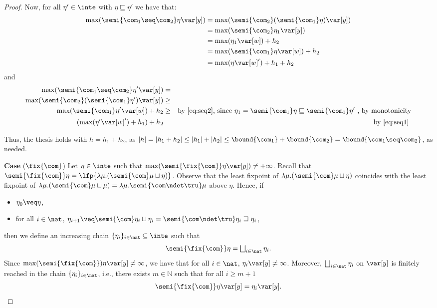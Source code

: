 \begin{proof}
  Now, for all \(\eta' \in \inte\) with \(\eta \sqsubseteq \eta'\) we have that:
  \begin{align*}
    \max(\semi{\com_1 \seq \com_2}\eta \var[y])
    &= \max(\semi{\com_2}(\semi{\com_1}\eta) \var[y])\\
    & = \max(\semi{\com_2}\eta_1 \var[y])\\
    & = \max(\eta_1 \var[w]) + h_2\\
    & = \max(\semi{\com_1}\eta \var[w]) + h_2\\
    & = \max(\eta \var[w]')+h_1 + h_2
  \end{align*}
  and
  \begin{align*}
    \max(\semi{\com_1 \seq \com_2}\eta' \var[y]) & = & \\ 
    \max(\semi{\com_2}(\semi{\com_1}\eta') \var[y]) & \geq & \\ 
    \max(\semi{\com_1}\eta' \var[w]) + h_2 & \geq & 
    \text{by \eqref{eq:seq2}, since } \eta_1 = \semi{\com_1}\eta \sqsubseteq \semi{\com_1}\eta' \text{ , by monotonicity} \\
    (\max(\eta' \var[w]') +h_1) + h_2 & & \text{by \eqref{eq:seq1}}\
  \end{align*}

  Thus, the thesis holds with \(h= h_1+h_2\), as
  \(|h| =|h_1 +h_2| \leq |h_1| + |h_2| \leq \bound{\com_1} +
  \bound{\com_2} = \bound{\com_1 \seq \com_2}\), as needed.

  
  \medskip
  
  \noindent
  \textbf{Case} (\(\fix{\com}\)) 
  Let \(\eta \in \inte\) such that
  \(\max(\semi{\fix{\com}} \eta \var[y]) \neq + \infty\). Recall that
  \(\semi{\fix{\com}} \eta = \lfp{\lambda \mu. (\semi{\com} \mu
    \sqcup\eta)}\). Observe that the least fixpoint of
  \(\lambda \mu. (\semi{\com} \mu \sqcup\eta)\) coincides with the
  least fixpoint of
  \(\lambda \mu. (\semi{\com} \mu \sqcup \mu) = \lambda \mu. \semi{
    \com\ndet \tru} \mu\) above \(\eta\). Hence, if
  \begin{itemize}
  \item \(\eta_0 \veq \eta\),
  \item for all \(i\in \nat\),
    \(\eta_{i+1} \veq \semi{\com} \eta_i \sqcup \eta_i= \semi{\com \ndet
    \tru} \eta_i \sqsupseteq \eta_i\),
  \end{itemize}
  then we define an increasing chain \(\{\eta_i\}_{i\in \nat}\subseteq \inte\) such that
  \[ 
  \semi{\fix{\com}} \eta = \textstyle\bigsqcup_{i \in \nat} \eta_i.
  \]
  Since \(\max(\semi{\fix{\com}}) \eta \var[y] \neq \infty\), we have that
  for all \(i\in \nat\), \(\eta_i \var[y] \neq \infty\). Moreover,
  \(\textstyle\bigsqcup_{i \in \nat} \eta_i\) on \(\var[y]\) is
  finitely reached in the chain \(\{\eta_i\}_{i\in \nat}\), i.e.,
  there exists \(m \in \mathbb{N}\) such that for all \(i \geq m+1\)
  \[
  \semi{\fix{\com}} \eta \var[y] = \eta_{i} \var[y].
  \]


\end{proof}
